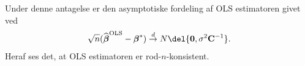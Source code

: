 Under denne antagelse er den asymptotiske fordeling af OLS estimatoren givet ved
\begin{align*}
\sqrt{n}(\widehat{\boldsymbol{\beta}}^{\text{OLS}}-\boldsymbol{\beta}^*) \overset{d}{\rightarrow} N \del{\mathbf{0},\sigma^2 \mathbf{C}^{-1}}.
\end{align*}
Heraf ses det, at OLS estimatoren er rod-\(n\)-konsistent.

